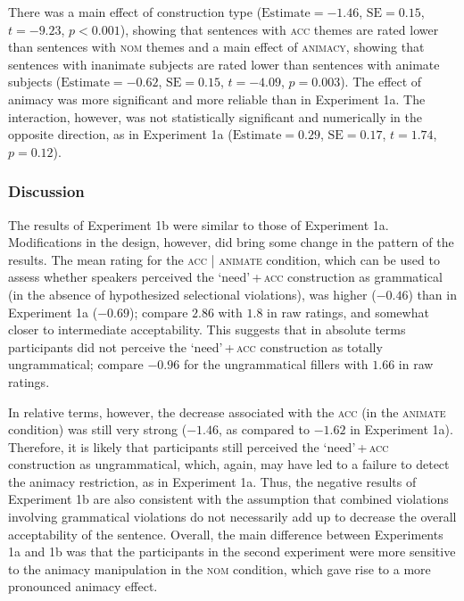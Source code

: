 \documentclass[output=paper]{langscibook}
\begin{document}
There was a main effect of construction type ($\text{Estimate} = -1.46$, $\text{SE} = 0.15$, $t = -9.23$, $p < 0.001$), showing that sentences with \textsc{acc} themes are rated lower than sentences with \textsc{nom} themes and a main effect of \textsc{animacy}, showing that sentences with inanimate subjects are rated lower than sentences with animate subjects ($\text{Estimate} = -0.62$, $\text{SE} = 0.15$, $t = -4.09$, $p = 0.003$). The effect of animacy was more significant and more reliable than in Experiment 1a. The interaction, however, was not statistically significant and numerically in the opposite direction, as in Experiment 1a ($\text{Estimate} = 0.29$, $\text{SE} = 0.17$, $t = 1.74$, $p = 0.12$).

\subsubsection{Discussion}

The results of Experiment 1b were similar to those of Experiment 1a. Modifications in the design, however, did bring some change in the pattern of the results. The mean rating for the \textsc{acc} | \textsc{animate} condition, which can be used to assess whether speakers perceived the `need'\,+\,\textsc{acc} construction as grammatical (in the absence of hypothesized selectional violations), was higher ($-0.46$) than in Experiment 1a ($-0.69$); compare $2.86$ with $1.8$ in raw ratings, and somewhat closer to intermediate acceptability. This suggests that in absolute terms participants did not perceive the `need'\,+\,\textsc{acc} construction as totally ungrammatical; compare $-0.96$ for the ungrammatical fillers with $1.66$ in raw ratings.

In relative terms, however, the decrease associated with the \textsc{acc} (in the \textsc{animate} condition) was still very strong ($-1.46$, as compared to $-1.62$ in Experiment 1a). Therefore, it is likely that participants still perceived the `need'\,+\,\textsc{acc} construction as ungrammatical, which, again, may have led to a failure to detect the animacy restriction, as in Experiment 1a. Thus, the negative results of Experiment 1b are also consistent with the assumption that combined violations involving grammatical violations do not necessarily add up to decrease the overall acceptability of the sentence. Overall, the main difference between Experiments 1a and 1b was that the participants in the second experiment were more sensitive to the animacy manipulation in the \textsc{nom} condition, which gave rise to a more pronounced animacy effect.
\end{document}
